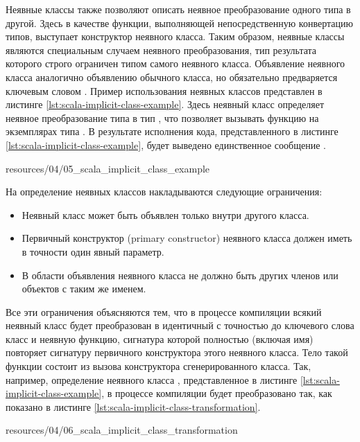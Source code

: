 Неявные классы также позволяют описать неявное преобразование одного типа в другой. Здесь в качестве функции, выполняющей непосредственную конвертацию типов, выступает конструктор неявного класса. Таким образом, неявные классы являются специальным случаем неявного преобразования, тип результата которого строго ограничен типом самого неявного класса. Объявление неявного класса аналогично объявлению обычного класса, но обязательно предваряется ключевым словом . Пример использования неявных классов представлен в листинге \ref{lst:scala-implicit-class-example}. Здесь неявный класс  определяет неявное преобразование типа  в тип , что позволяет вызывать функцию  на экземплярах типа . В результате исполнения кода, представленного в листинге \ref{lst:scala-implicit-class-example}, будет выведено единственное сообщение .


{resources/04/05_scala_implicit_class_example}

На определение неявных классов накладываются следующие ограничения:
\begin{itemize}
	\item Неявный класс может быть объявлен только внутри другого класса.
	\item Первичный конструктор (primary constructor) неявного класса должен иметь в точности один явный параметр.
	\item В области объявления неявного класса не должно быть других членов или объектов с таким же именем.
\end{itemize}
Все эти ограничения объясняются тем, что в процессе компиляции всякий неявный класс будет преобразован в идентичный с точностью до ключевого слова  класс и неявную функцию, сигнатура которой полностью (включая имя) повторяет сигнатуру первичного конструктора этого неявного класса. Тело такой функции состоит из вызова конструктора сгенерированного класса. Так, например, определение неявного класса , представленное в листинге \ref{lst:scala-implicit-class-example}, в процессе компиляции будет преобразовано так, как показано в листинге \ref{lst:scala-implicit-class-transformation}.


{resources/04/06_scala_implicit_class_transformation}

